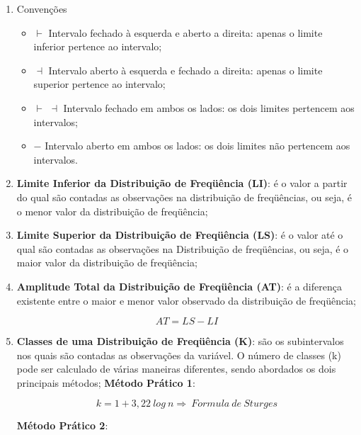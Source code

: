 \begin{enumerate}
  \item Convenções
  \begin{itemize}
    \item $\vdash$ Intervalo fechado à esquerda e aberto a direita: apenas o limite inferior pertence ao intervalo;
    \item $\dashv$ Intervalo aberto à esquerda e fechado a direita: apenas o limite superior pertence ao intervalo;
    \item $\vdash$ $\dashv$ Intervalo fechado em ambos os lados: os dois limites pertencem aos intervalos;
    \item $-$ Intervalo aberto em ambos os lados: os dois limites não pertencem aos intervalos.
  \end{itemize}
  \item \textbf{Limite Inferior da Distribuição de Freqüência (LI)}: é o valor a partir do qual são contadas as observações na distribuição de freqüências, ou seja, é o menor valor da distribuição de freqüência;
  \item \textbf{Limite Superior da Distribuição de Freqüência (LS)}: é o valor até o qual são contadas as observações na Distribuição de freqüências, ou seja, é o maior valor da distribuição de freqüência;
  \item \textbf{Amplitude Total da Distribuição de Freqüência (AT)}: é a diferença existente entre o maior e menor valor observado da distribuição de freqüência;

     $$ AT=LS-LI $$

  \item \textbf{Classes de uma Distribuição de Freqüência (K)}: são os subintervalos nos quais são contadas as observações da variável. O número de classes (k) pode ser calculado de várias maneiras diferentes, sendo abordados os dois principais métodos;\vskip0.3cm
\textbf{Método Prático 1}:

$$ k= 1+3,22 \ log \ n \Rightarrow \ Formula \ de \ Sturges $$

\textbf{Método Prático 2}: \vskip0.3cm


\end{enumerate}

